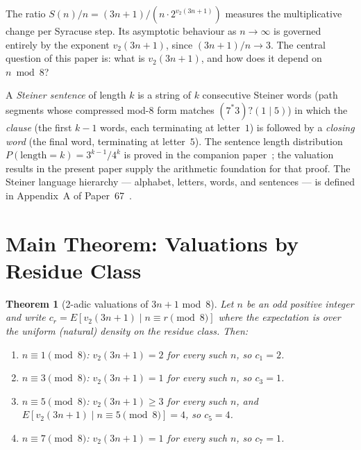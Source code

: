 \documentclass[12pt]{article}
\newtheorem{theorem}{Theorem}[section]
\theoremstyle{definition}
\theoremstyle{remark}
\newcommand{\vt}{v_2}
\newcommand{\Sm}{S}
\begin{document}
The ratio $\Sm(n)/n = (3n+1)/(n \cdot 2^{\vt(3n+1)})$ measures the multiplicative
change per Syracuse step. Its asymptotic behaviour as $n \to \infty$ is governed
entirely by the exponent $\vt(3n+1)$, since $(3n+1)/n \to 3$. The central
question of this paper is: what is $\vt(3n+1)$, and how does it depend on
$n \bmod 8$?

A \emph{Steiner sentence} of length $k$ is a string of $k$ consecutive
Steiner words (path segments whose compressed mod-8 form matches
$(7^*3)?(1\mid 5)$) in which the \emph{clause} (the first $k-1$ words,
each terminating at letter~$1$) is followed by a \emph{closing word} (the final word,
terminating at letter~$5$).
The sentence length distribution $P(\text{length}=k) = 3^{k-1}/4^k$ is proved
in the companion paper~\cite{paper67}; the valuation results in the present paper
supply the arithmetic foundation for that proof.
The Steiner language hierarchy — alphabet, letters, words, and sentences — is
defined in Appendix~A of Paper~67~\cite{paper67}.

\section{Main Theorem: Valuations by Residue Class}
\label{sec:main}

\begin{theorem}[2-adic valuations of $3n+1$ mod~8]
\label{thm:v2}
Let $n$ be an odd positive integer and write $c_r = E[\vt(3n+1) \mid n \equiv r \pmod{8}]$
where the expectation is over the uniform (natural) density on the residue class.
Then:
\begin{enumerate}
  \item $n \equiv 1 \pmod{8}$: $\vt(3n+1) = 2$ for every such $n$, so $c_1 = 2$.
  \item $n \equiv 3 \pmod{8}$: $\vt(3n+1) = 1$ for every such $n$, so $c_3 = 1$.
  \item $n \equiv 5 \pmod{8}$: $\vt(3n+1) \geq 3$ for every such $n$,
        and $E[\vt(3n+1) \mid n \equiv 5 \pmod{8}] = 4$, so $c_5 = 4$.
  \item $n \equiv 7 \pmod{8}$: $\vt(3n+1) = 1$ for every such $n$, so $c_7 = 1$.
\end{enumerate}
\end{theorem}
\end{document}
